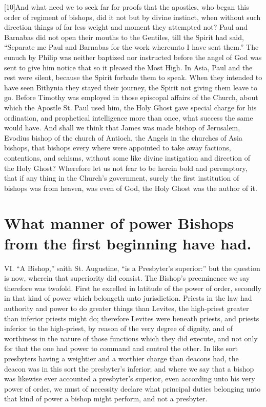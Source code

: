 [10]And what need we to seek far for proofs that the apostles, who began this order of regiment of bishops, did it not but by divine instinct, when without such direction things of far less weight and moment they attempted not? Paul and Barnabas did not open their mouths to the Gentiles, till the Spirit had said, “Separate me Paul and Barnabas for the work whereunto I have sent them.” The eunuch by Philip was neither baptized nor instructed before the angel of God was sent to give him notice that so it pleased the Most High. In Asia, Paul and the rest were silent, because the Spirit forbade them to speak. When they intended to have seen Bithynia they stayed their journey, the Spirit not giving them leave to go. Before Timothy was employed in those episcopal affairs of the Church, about which the Apostle St. Paul used him, the Holy Ghost gave special charge for his ordination, and prophetical intelligence  more than once,
 what success the same would have. And shall we think that James was made bishop of Jerusalem, Evodius bishop of the church of Antioch, the Angels in the churches of Asia bishops, that bishops every where were appointed to take away factions, contentions, and schisms, without some like divine instigation and direction of the Holy Ghost? Wherefore let us not fear to be herein bold and peremptory, that if any thing in the Church’s government, surely the first institution of bishops was from heaven, was even of God, the Holy Ghost was the author of it.

\section*{What manner of power Bishops from the first beginning have had.}

VI. “A Bishop,” saith St. Augustine, “is a Presbyter’s superior:” but the question is now, wherein that superiority did consist. The Bishop’s preeminence we say therefore was twofold. First he excelled in latitude of the power of order, secondly in that kind of power which belongeth unto jurisdiction. Priests in the law had authority and power to do greater things than Levites, the high-priest greater than inferior priests might do; therefore Levites were beneath priests, and priests inferior to the high-priest, by reason of the very degree of dignity, and of worthiness in the nature of those functions which they did execute, and not only for that the one had power to command and control the other. In like sort presbyters having a weightier and a worthier charge than deacons had, the deacon was in this sort the presbyter’s inferior; and where we say that a bishop was likewise ever accounted a presbyter’s superior, even according unto his very power of order, we must of necessity declare what principal duties belonging unto that kind of power a bishop might perform, and not a presbyter.


